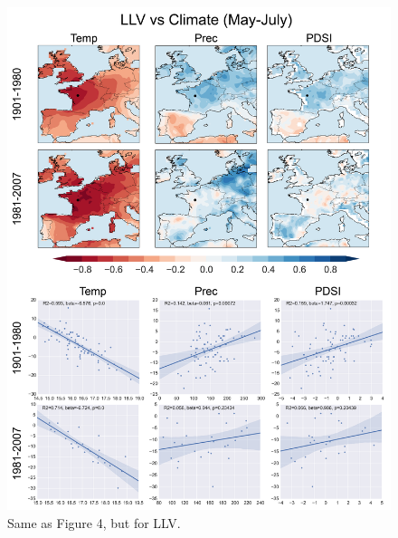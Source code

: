 \documentclass[12pt]{article}
\begin{document}
\begin{figure}
\center
\includegraphics[width=.9\columnwidth,scale=2]{SUPP_fig_09_LLV_MJJ_climate_onedeg.png}
\caption{Same as Figure 4, but for LLV.}
\end{figure}
\end{document}
